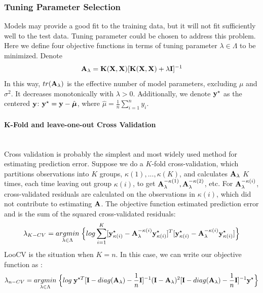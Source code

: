 \documentclass[11pt]{article}
\begin{document}
\subsubsection{{Tuning Parameter Selection}}
Models may provide a good fit to the training data, but it will not fit sufficiently well to the test data. Tuning parameter could be chosen to address this problem. Here we define four objective functions in terms of tuning parameter $\lambda \in \Lambda$ to be minimized. Denote
\begin{align}
{\bf A}_\lambda={\bf K}({\bf X}, {\bf X})[{\bf K}({\bf X}, {\bf X})+\lambda {\bf I}]^{-1}
\end{align}
In this way, $tr({\bf A}_\lambda)$ is the effective number of model parameters, excluding $\mu$ and $\sigma^2$. It decreases monotonically with $\lambda>0$. Additionally, we denote ${\bf y}^\star$ as the centered ${\bf y}$: ${\bf y}^\star={\bf y}-\hat{\boldsymbol{\mu}}$, where $\hat{\mu}=\frac{1}{n}\sum_{i=1}^ny_i$.

\paragraph{K-Fold and leave-one-out Cross Validation}\mbox{}\\
Cross validation is probably the simplest and most widely used method for estimating prediction error. Suppose we do a $K$-fold cross-validation, which partitions observations into $K$ groups, $\kappa(1),...,\kappa(K)$, and calculates ${\bf A}_\lambda$ $K$ times, each time leaving out group $\kappa(i)$, to get ${\bf A}_\lambda^{-\kappa(1)}, {\bf A}_\lambda^{-\kappa(2)}$, etc. For ${\bf A}_\lambda^{-\kappa(i)}$, cross-validated residuals are calculated on the observations in $\kappa(i)$, which did not contribute to estimating ${\bf A}$. The objective function estimated prediction error and is the sum of the squared cross-validated residuals:
\begin{align}
\lambda_{K-CV}=\underset{\lambda \in \Lambda}{argmin}\;\Big\{log\sum_{i=1}^K[{\bf y}_{\kappa(i)}^\star-{\bf A}_\lambda^{-\kappa(i)}{\bf y}_{\kappa(i)}^\star]^T[{\bf y}_{\kappa(i)}^\star-{\bf A}_\lambda^{-\kappa(i)}{\bf y}_{\kappa(i)}^\star]\Big\}
\end{align}
LooCV is the situation when $K=n$. In this case, we can write our objective function as \citep{golub_generalized_1979}:
\begin{align}
\lambda_{n-CV}=\underset{\lambda \in \Lambda}{argmin}\;\Big\{log\;{\bf y}^{\star T}[{\bf I}-diag({\bf A}_\lambda)-\frac{1}{n}{\bf I}]^{-1}({\bf I}-{\bf A}_\lambda)^2[{\bf I}-diag({\bf A}_\lambda)-\frac{1}{n}{\bf I}]^{-1}{\bf y}^\star \Big\} \label{3}
\end{align}
\end{document}
